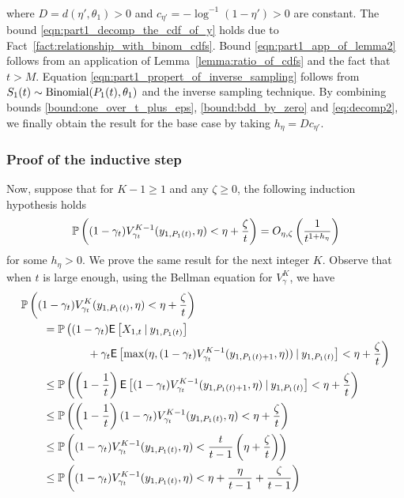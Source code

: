 \begin{myproof}[Proof.]
\begin{align}
	\end{align}
	where $D = d(\eta',\theta_1) > 0$ and $c_{\eta'} = -\log^{-1}(1-\eta') > 0$ are constant. The bound \eqref{eqn:part1_decomp_the_cdf_of_y} holds due to Fact~\eqref{fact:relationship_with_binom_cdfs}. Bound \eqref{eqn:part1_app_of_lemma2} follows from an application of Lemma~\ref{lemma:ratio_of_cdfs} and the fact that $t > M$. Equation \eqref{eqn:part1_propert_of_inverse_sampling} follows from $S_1(t) \sim \text{Binomial}(P_{1}(t), \theta_1)$ and the inverse sampling technique. By combining bounds \eqref{bound:one_over_t_plus_eps}, \eqref{bound:bdd_by_zero} and \eqref{eq:decomp2}, we finally obtain the result for the base case by taking $h_\eta = Dc_{\eta'}$.

	\subsubsection*{Proof of the inductive step}
	 Now, suppose that for $K-1 \ge 1$ and any $\zeta \ge 0$,  the following induction hypothesis holds
	\[
	\mathbb{P} \left( (1-\gamma_t)V^{K-1}_{\gamma_t}(y_{1,P_{1}(t)}, \eta) < \eta + \frac{\zeta}{t} \right) = O_{\eta,\zeta}\left(\frac{1}{t^{1 + h_\eta}}\right)
	\]
	for some $h_\eta > 0$. We prove the same result for the next integer $K$. Observe that when $t$ is large enough, using the Bellman equation for $V^K_\gamma$, we have
	\begin{align}
	&\P{(1-\gamma_t)V^K_{\gamma_t}(y_{1,\Nt{1}}, \eta) < \eta + \frac{\zeta}{t}} \nonumber  \\
	&\qquad = \mathbb{P}\left((1-\gamma_t)\Ee{X_{1,t} \given y_{1,\Nt{1}}}  \right. \nonumber\\
	&\hspace{6em} + \gamma_t \Ee{\max(\eta, (1-\gamma_t)V^{K-1}_{\gamma_t}(y_{1,\Nt{1}+1}, \eta)) \given y_{1,\Nt{1}}} < \eta + \frac{\zeta}{t}\bigg) \label{eq:appl_of_lemma_9} \\
	& \qquad \le \P{ \left(1-\frac{1}{t}\right) \Ee{(1-\gamma_t)V^{K-1}_{\gamma_{t}}(y_{1,\Nt{1}+1}, \eta) \given y_{1,\Nt{1}} }< \eta + \frac{\zeta}{t}} \nonumber \\
	& \qquad \le \P{\left(1-\frac{1}{t}\right)(1-\gamma_t) V^{K-1}_{\gamma_{t}}(y_{1,\Nt{1}}, \eta)< \eta  + \frac{\zeta}{t}} \label{ineq:missing_step} \\
	& \qquad \le \P{ (1-\gamma_t)V^{K-1}_{\gamma_{t}}(y_{1,\Nt{1}}, \eta)< \frac{t}{t-1}\left(\eta +  \frac{\zeta}{t}}\right) \nonumber \\
	& \qquad \le \P{ (1-\gamma_t)V^{K-1}_{\gamma_{t}}(y_{1,\Nt{1}}, \eta)< \eta + \frac{\eta}{t-1} +  \frac{\zeta}{t-1}} \nonumber \\

\end{align}
\end{myproof}
